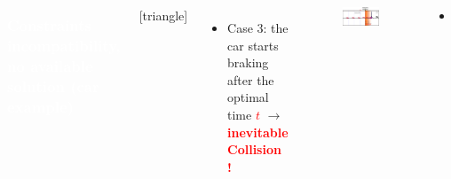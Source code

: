 \begin{frame}
  \begin{columns}
    \column{\dimexpr\paperwidth-4pt}
\frametitle{{\textcolor{white}{\hspace{0.3cm}Constraints incompatibility, no available solution (car example)}}}


[triangle]  
\begin{itemize}
\addtolength{\itemindent}{-0mm}
\item Case 3: the car starts braking after the optimal time \textcolor{red}{$t$} $\rightarrow$ \textbf{\textcolor{red}{inevitable Collision !}}
\end{itemize}


\begin{figure}[!ht]
\centering
\includegraphics[width=0.89\linewidth]{figures/car_example_13}
\end{figure}

\vspace{1mm}
\begin{itemize}

\item[\hookrightarrow] 
\end{itemize}



  \end{columns}
\end{frame}








